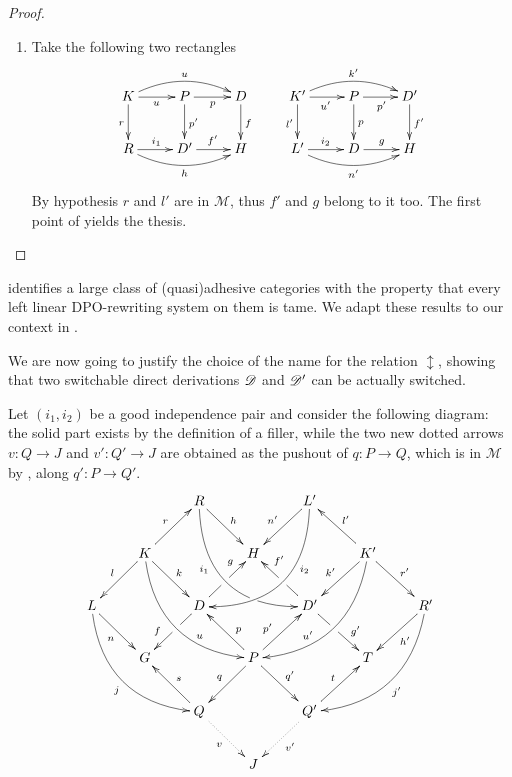 \begin{proof}
\begin{enumerate}
	\item Take the following two rectangles
\[\xymatrix{K \ar@/^.4cm/[rr]^{u}\ar[d]_{r}\ar[r]_{u} &P\ar[d]^{p'} \ar[r]_{p} & D \ar[d]^{f}&K' \ar@/^.4cm/[rr]^{k'}\ar[d]_{l'}\ar[r]_{u'} &P\ar[d]^{p} \ar[r]_{p'} & D' \ar[d]^{f'}\\  R \ar@/_.4cm/[rr]_{h} \ar[r]^{i_1}&D' \ar[r]^{f'} & H&L' \ar@/_.4cm/[rr]_{n'} \ar[r]^{i_2}&D \ar[r]^{g} & H}\]
	By hypothesis $r$ and $l'$ are in $\mathcal{M}$, thus $f'$ and $g$ belong to it too. The first point of   yields the thesis. \qedhere 
\end{enumerate}
\end{proof}

\begin{remark} \cite{baldan2011adhesivity} identifies a large class of (quasi)adhesive categories with the property that every left linear DPO-rewriting system on them is tame. We adapt these results to our context in . 
\end{remark}
\begin{definition}
\end{definition}

\begin{remark}
\end{remark}


We are now going to justify the choice of the name for the relation $\updownarrow$, showing that two switchable direct derivations $\mathscr{D}$ and $\mathscr{D'}$ can be actually switched. 

Let $(i_1, i_2)$ be a good independence pair and consider the following diagram: the solid part exists by the definition of a filler, while the two new dotted arrows $v\colon Q\to J$ and $v'\colon Q'\to J$ are obtained  as the pushout of $q\colon P\to Q$, which is in $\mathcal{M}$ by , along $q'\colon P\to Q'$.
	\[\xymatrix{&&R \ar@/_1cm/[ddrr]_(.35){i_1}|(.7)\hole \ar[dr]^{h}&& L'\ar@/^1cm/[ddll]^(.35){i_2}  \ar[dl]_{n'}\\&K\ar[dr]^{k}\ar[dl]_{l} \ar@/_.8cm/[ddrr]^(.65){u}\ar[ur]^{r}&& H && K' \ar@/^.8cm/[ddll]_(.65){u'}\ar[dl]_{k'}\ar[lu]_{l'} \ar[dr]^{r'}\\L \ar[dr]_{n} \ar@/_.8cm/[ddrr]_{j}&& D \ar[dl]|(.42)\hole_(.64){f}\ar[ur]|(.48)\hole^(.7){g}&&D' \ar[dr]|(.42)\hole^(.65){g'} \ar[ul]|(.48)\hole_(.7){f'}&&R'\ar@/^.8cm/[ddll]^{j'}\ar[dl]^{h'}\\&G &&P\ar[dr]^{q'} \ar[dl]_{q}\ar[ur]^(.4){p'}\ar[ul]_(.4){p}&&T\\&&Q \ar[ul]_{s}\ar@{.>}[dr]_{v} &&Q'\ar[ur]^{t} \ar@{.>}[dl]^{v'}\\&&&J}\]
	
